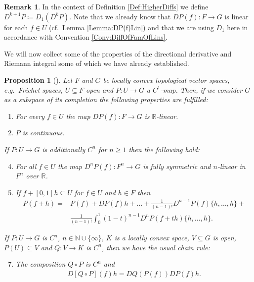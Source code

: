 \documentclass[12pt,a4paper]{article}
\theoremstyle{plain}
\newtheorem{proposition}[theorem]{Proposition}
\theoremstyle{definition}
\newtheorem{remark}[theorem]{Remark}
\newcommand{\R}{\mathbb{R}}
\newcommand{\N}{\mathbb{N}}
\begin{document}
\begin{remark}
In the context of Definition \ref{Def:HigherDiffs} we define $D^{k+1}P\coloneqq D_1(D^kP)$. Note that we already know that $DP(f):F\to G$ is linear for each $f\in U$ (cf.~Lemma \ref{Lemma:DP(f)Lin}) and that we are using $D_1$ here in accordance with Convention \ref{Conv:DiffOfFamOfLins}.
\end{remark}


We will now collect some of the properties of the directional derivative and Riemann integral some of which we have already established.
\begin{proposition}[{\cite[Lemma II.2.3, Proposition II.2.5]{InfDimLieneeb}}]
\label{Prop:PropsOfDiff}
Let $F$ and $G$ be locally convex topological vector spaces, e.g.~Fréchet spaces, $U\subseteq F$ open and $P:U\to G$ a $C^1$-map. Then, if we consider $G$ as a subspace of its completion the following properties are fulfilled:
\begin{enumerate}
    \item \label{Item:DiffLin} For every $f\in U$ the map $DP(f):F\to G$ is $\R$-linear.
    \item $P$ is continuous.
\end{enumerate}
If $P:U\to G$ is additionally $C^n$ for $n\geq 1$ then the following hold:
\begin{enumerate}
\setcounter{enumi}{3}
    \item \label{Item:HigherDiffMultLin} For all $f\in U$ the map $D^nP(f):F^n\to G$ is fully symmetric and $n$-linear in $F^n$ over $\R$.
    \item If $f+[0,1]h\subseteq U$ for $f\in U$ and $h\in F$ then 
    \begin{align*}
        P(f+h)=&P(f)+DP(f)h+\ldots+\frac{1}{(n-1)!}D^{n-1}P(f)\{h,\ldots,h\}+\\
        &\frac{1}{(n-1)!}\int_0^1(1-t)^{n-1}D^nP(f+th)\{h,\ldots,h\}.
    \end{align*}
\end{enumerate}
If $P:U\to G$ is $C^n$, $n\in \N\cup \{\infty\}$, $K$ is a locally convex space, $V\subseteq G$ is open, $P(U)\subseteq V$ and $Q:V\to K$ is $C^n$, then we have the usual chain rule:
\begin{enumerate}
\setcounter{enumi}{6}    
    \item The composition $Q\circ P$ is $C^n$ and 
    \begin{align*}
        D[Q\circ P](f)h=DQ(P(f))DP(f)h.
    \end{align*}
\end{enumerate}
\end{proposition}
\end{document}
